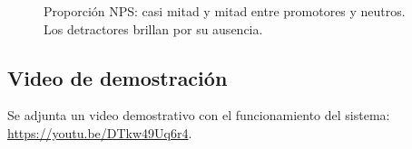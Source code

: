\begin{figure}[h]
	\centering
	\caption{Proporción NPS: casi mitad y mitad entre promotores y neutros. Los detractores brillan por su ausencia.}
	\label{fig:nps_torta}
\end{figure}

\subsection{Video de demostración}

Se adjunta un video demostrativo con el funcionamiento del sistema:  
\url{https://youtu.be/DTkw49Uq6r4}.